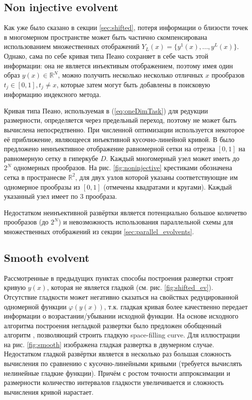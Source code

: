 \documentclass[runningheads]{llncs}
\begin{document}
\subsection{Non injective evolvent}
\begin{Russian}

Как уже было сказано в секции \ref{sec:shifted}, потеря информации о близости точек в многомерном пространстве может быть частично скомпенсирована использованием множественных отображений $Y_L(x)=\{y^1(x),...,y^L(x)\}$. Однако, сама по себе кривая типа Пеано сохраняет в себе часть этой информации: она не является инъективым отображением, поэтому имея один образ $y(x)\in \mathbb{R}^N$, можно получить несколько несколько отличных $x$ прообразов $t_j\in[0,1], t_j \not = x$, которые затем могут быть добавлены в поисковую информацию индексного метода.

Кривая типа Пеано, используемая в (\ref{eq:oneDimTask}) для редукции размерности, определяется через предельный переход,
поэтому не может быть вычислена непосредтвенно. При численной оптимизации используется некоторое её приближение, являющееся
инъективной кусочно-линейной кривой. В \cite{strongin1978} было предложено неинъективное отображение равномерной сетки на отрезка $[0,1]$ на равномерную сетку в гиперкубе $D$. Каждый многомерный узел может иметь до $2^N$ одномерных прообразов. На рис. \ref{fig:noninjective} крестиками обозначена сетка в пространесве $\mathbb{R}^2$, для двух узлов которой указаны соответствующие им одномерное прообразы из $[0,1]$ (отмечены квадратами и кругами). Каждый указанный узел имеет по 3 прообраза.

Недостатком неинъективной развёртки является потенциально большое количетво прообразов (до $2^N$) и невозможность использования параллельной схемы для множественных отображений из секции \ref{sec:parallel_evolvents}.


\subsection{Smooth evolvent}

Рассмотренные в предыдущих пунктах способы построения развертки строят кривую $y(x)$, которая не является гладкой (см. рис. \ref{fig:shifted_ev}). Отсутствие гладкости может негативно сказаться на свойствах редуцированной одномерной функции $\varphi(y(x))$, т.к. гладкая кривая более качественно передает информации о возрастании/убывании исходной функции. На основе исходного алгоритма построения негладкой развертки было предложен обобщенный алгоритм \cite{Goryachih2017}, позволяющий строить гладкую space-filling curve. Для иллюстрации на рис. \ref{fig:smooth} изображена гладкая развертка в двумерном случае. Недостатком гладкой развёртки является в несколько раз большая сложность вычисления по сравнению с кусочно-линейными кривыми (требуется вычислять нелинейные гладкие функции). Причём с ростом точности аппроксимации и размерности количество интервалов гладкости увеличивается и сложность вычисления кривой нарастает.

\end{Russian}
\end{document}
